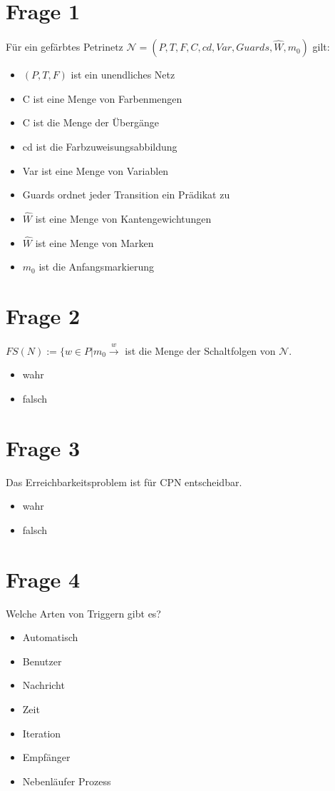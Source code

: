 \documentclass[12pt]{article}
\begin{document}
\section*{Frage 1}
Für ein gefärbtes Petrinetz $\mathcal{N}=(P,T,F,C,cd,Var,Guards,\widehat{W},m_0 )$ gilt:
\begin{itemize}
\item{$(P,T,F)$ ist ein unendliches Netz}
\item{C ist eine Menge von Farbenmengen}
\item{C ist die Menge der Übergänge}
\item{cd ist die Farbzuweisungsabbildung}
\item{Var ist eine Menge von Variablen}
\item{Guards ordnet jeder Transition ein Prädikat zu}
\item{$\widehat{W}$ ist eine Menge von Kantengewichtungen}
\item{$\widehat{W}$ ist eine Menge von Marken}
\item{$m_0$ ist die Anfangsmarkierung}
\end{itemize}
\section*{Frage 2}
$FS(N):=\{w\in P | m_0 \xrightarrow{w}$ ist die Menge der Schaltfolgen von $\mathcal{N}$.
\begin{itemize}
\item{wahr}
\item{falsch}
\end{itemize}
\section*{Frage 3}
Das Erreichbarkeitsproblem ist für CPN entscheidbar.
\begin{itemize}
\item{wahr}
\item{falsch}
\end{itemize}
\section*{Frage 4}
Welche Arten von Triggern gibt es?
\begin{itemize}
\item{Automatisch}
\item{Benutzer}
\item{Nachricht}
\item{Zeit}
\item{Iteration}
\item{Empfänger}
\item{Nebenläufer Prozess}
\end{itemize}
\end{document}
